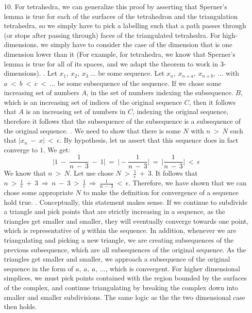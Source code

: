 \documentclass{article}
\begin{document}
10. For tetrahedra, we can generalize this proof by asserting that Sperner's lemma is true for each of the surfaces of the tetrahedron and the triangulation tetrahedra, so we simply have to pick a labelling such that a path passes through (or stops after passing through) faces of the triangulated tetrahedra. For high-dimensions, we simply have to consider the case of the dimension that is one dimension lower than it (For example, for tetrahedra, we know that Sperner's lemma is true for all of its spaces, and we adapt the theorem to work in 3-dimensions).
\newline{}. Let $x_1, \ x_2, \ x_3 \ ...$ be some sequence. Let $x_n, \ x_{n+a}, \ x_{n+b}, \ ...$ with $a \ < \ b \ < \ c \ < \ ... $ be some subsequence of the sequence. If we chose some increasing set of numbers $A$, in the set of numbers indexing the subsequence. $B$, which is an increasing set of indices of the original sequence $C$, then it follows that $A$ is an increasing set of numbers in $C$, indexing the original sequence, therefore it follows that the subsequence of the subsequence is a subsequence of the original sequence.
\newline{}. We need to show that there is some $N$ with $n \ > \ N$ such that $|x_n \ - \ x| \ < \ \epsilon$. By hypothesis, let us assert that this sequence does in fact converge to $1$. We get:
\newline
$$\Big | 1 \ - \ \displaystyle\frac{1}{n \ - \ 3} \ - \ 1 \Big | \ = \ \Big | - \displaystyle\frac{1}{n \ - \ 3} \Big | \ = \ \Big |\displaystyle\frac{1}{n \ - \ 3} \Big | \ < \ \epsilon$$
\newline
We know that $n \ > \ N$. Let use chose $N \ > \ \frac{1}{\epsilon} \ + \ 3$. It follows that $n \ > \ \frac{1}{\epsilon} \ + \ 3 \ \Rightarrow \ n \ - \ 3 \ > \ \frac{1}{\epsilon} \ \Rightarrow \ \frac{1}{n \ - \ 3} \ < \ \epsilon$. Therefore, we have shown that we can chose some appropriate $N$ to make the definition for convergence of a sequence hold true.
\newline{}. Conceptually, this statement makes sense. If we continue to subdivide a triangle and pick points that are strictly increasing in a sequence, as the triangles get smaller and smaller, they will eventually converge towards one point, which is representative of $y$ within the sequence. In addition, whenever we are triangulating and picking a new triangle, we are creating subsequences of the previous subsequence, which are all subsequences of the original sequence. As the triangles get smaller and smaller, we approach a subsequence of the original sequence in the form of $a, \ a, \ a, \ …$, which is convergent. For higher dimensional simplices, we must pick points contained with the region bounded by the surfaces of the complex, and continue triangulating by breaking the complex down into smaller and smaller subdivisions. The same logic as the the two dimensional case then holds.
\end{document}
